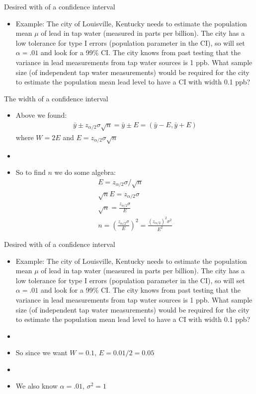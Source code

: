 \documentclass[xcolor=dvipsnames]{beamer}
\begin{document}
\begin{frame}{Desired with of a confidence interval}
	\begin{itemize}
		\item Example: The city of Louisville, Kentucky needs to estimate the population mean $\mu$ of lead in tap water (measured in parts per billion). The city has a low tolerance for type I errors (population parameter in the CI), so will set $\alpha = .01$ and look for a 99\% CI. The city knows from past testing that the variance in lead measurements from tap water sources is 1 ppb. What sample size (of independent tap water measurements) would be required for the city to estimate the population mean lead level to have a CI with width 0.1 ppb?
	\end{itemize}
\end{frame}

\begin{frame}{The width of a confidence interval}
\begin{itemize}
	\item Above we found:
	\begin{align*}
	\bar{y}\pm z_{\alpha/2} \sigma \sqrt{n} = \bar{y} \pm E = (\bar{y}-E, \bar{y}+E)
	\end{align*}
	where $W = 2E$ and $E = z_{\alpha/2} \sigma \sqrt{n}$  \pause
	\item[]
	\item So to find $n$ we do some algebra:
	\begin{gather*}
		E = z_{\alpha/2} \sigma / \sqrt{n} \\ 
		\sqrt{n} E = z_{\alpha/2} \sigma  \\
		\sqrt{n} = \frac{z_{\alpha/2} \sigma}{E} \\
		n = \left(\frac{z_{\alpha/2} \sigma}{E}\right)^2 = \frac{(z_{\alpha/2})^2 \sigma^2}{E^2}
	\end{gather*}
\end{itemize}
\end{frame}

\begin{frame}{Desired with of a confidence interval}
		\begin{itemize}
		\item Example: The city of Louisville, Kentucky needs to estimate the population mean $\mu$ of lead in tap water (measured in parts per billion). The city has a low tolerance for type I errors (population parameter in the CI), so will set $\alpha = .01$ and look for a 99\% CI. The city knows from past testing that the variance in lead measurements from tap water sources is 1 ppb. What sample size (of independent tap water measurements) would be required for the city to estimate the population mean lead level to have a CI with width 0.1 ppb? \pause
		\item[]
		\item So since we want $W = 0.1$, $E = 0.01/2 = 0.05$ \pause
		\item[]
		\item We also know $\alpha = .01$, $\sigma^2 = 1$
	\end{itemize}
\end{frame}
\end{document}
